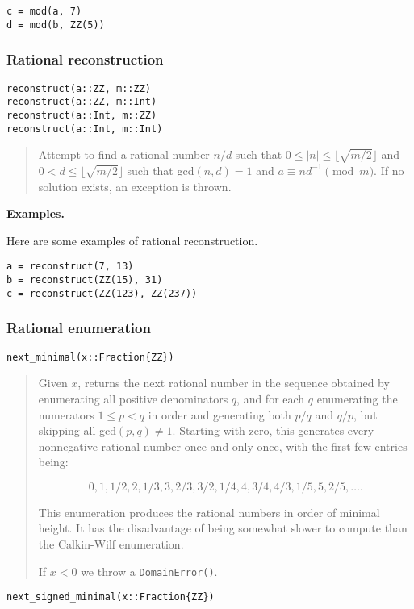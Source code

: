 \documentclass[a4paper,10pt]{article}
\newcommand{\code}{\lstinline}
\newcommand{\desc}[1]{\vspace{-3mm}\begin{quote}#1\end{quote}}
\begin{document}
{{\begin{lstlisting}
c = mod(a, 7)
d = mod(b, ZZ(5))
\end{lstlisting}

\subsubsection{Rational reconstruction}

\begin{lstlisting}
reconstruct(a::ZZ, m::ZZ)
reconstruct(a::ZZ, m::Int)
reconstruct(a::Int, m::ZZ)
reconstruct(a::Int, m::Int)
\end{lstlisting}

\desc{Attempt to find a rational number $n/d$ such that 
$0 \leq |n| \leq \lfloor\sqrt{m/2}\rfloor$ and 
$0 < d \leq \lfloor\sqrt{m/2}\rfloor$ such that gcd$(n, d) = 1$ and
$a \equiv nd^{-1} \pmod{m}$. If no solution exists, an exception is thrown.}

\textbf{Examples.}

Here are some examples of rational reconstruction.

\begin{lstlisting}
a = reconstruct(7, 13)
b = reconstruct(ZZ(15), 31)
c = reconstruct(ZZ(123), ZZ(237))
\end{lstlisting}

\subsubsection{Rational enumeration}

\begin{lstlisting}
next_minimal(x::Fraction{ZZ})
\end{lstlisting}

\desc{Given $x$, returns the next rational number in the sequence obtained by
enumerating all positive denominators $q$, and for each $q$ enumerating
the numerators $1 \le p < q$ in order and generating both $p/q$ and $q/p$,
but skipping all gcd$(p,q) \neq 1$. Starting with zero, this generates
every nonnegative rational number once and only once, with the first
few entries being:

$$0, 1, 1/2, 2, 1/3, 3, 2/3, 3/2, 1/4, 4, 3/4, 4/3, 1/5, 5, 2/5, \ldots.$$

This enumeration produces the rational numbers in order of minimal height. 
It has the disadvantage of being somewhat slower to compute than the
Calkin-Wilf enumeration.

If $x < 0$ we throw a \code{DomainError()}.}

\begin{lstlisting}
next_signed_minimal(x::Fraction{ZZ})
\end{lstlisting}

}}
\end{document}
